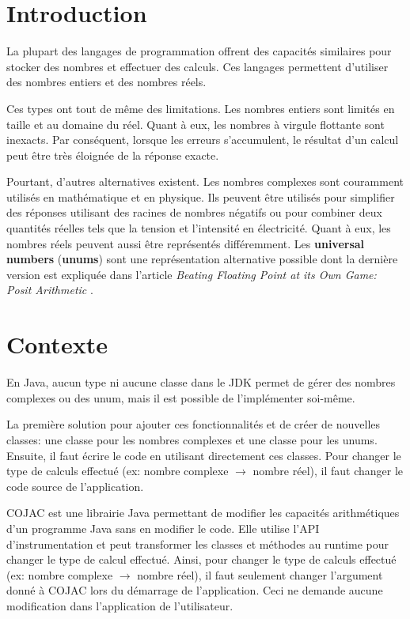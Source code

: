 \section{Introduction}

La plupart des langages de programmation offrent des capacités similaires pour stocker des nombres et effectuer des calculs. Ces langages permettent d'utiliser des nombres entiers et des nombres réels.

Ces types ont tout de même des limitations. Les nombres entiers sont limités en taille et au domaine du réel. Quant à eux, les nombres à virgule flottante sont inexacts. Par conséquent, lorsque les erreurs s'accumulent, le résultat d'un calcul peut être très éloignée de la réponse exacte.

Pourtant, d'autres alternatives existent. Les nombres complexes sont couramment utilisés en mathématique et en physique. Ils peuvent être utilisés pour simplifier des réponses utilisant des racines de nombres négatifs ou pour combiner deux quantités réelles tels que la tension et l'intensité en électricité. Quant à eux, les nombres réels peuvent aussi être représentés différemment. Les \textbf{universal numbers} (\textbf{unums}) sont une représentation alternative possible dont la dernière version est expliquée dans l'article \textit{Beating Floating Point at its Own Game: Posit Arithmetic} \cite{posit}.


\section{Contexte}

En Java, aucun type ni aucune classe dans le JDK permet de gérer des nombres complexes ou des unum, mais il est possible de l'implémenter soi-même.

La première solution pour ajouter ces fonctionnalités et de créer de nouvelles classes: une classe pour les nombres complexes et une classe pour les unums. Ensuite, il faut écrire le code en utilisant directement ces classes. Pour changer le type de calculs effectué (ex: nombre complexe $\rightarrow$ nombre réel), il faut changer le code source de l'application.

COJAC \cite{COJAC} est une librairie Java permettant de modifier les capacités arithmétiques d'un programme Java sans en modifier le code. Elle utilise l'API d'instrumentation et peut transformer les classes et méthodes au runtime pour changer le type de calcul effectué. Ainsi, pour changer le type de calculs effectué (ex: nombre complexe $\rightarrow$ nombre réel), il faut seulement changer l'argument donné à COJAC \cite{COJAC} lors du démarrage de l'application. Ceci ne demande aucune modification dans l'application de l'utilisateur.

